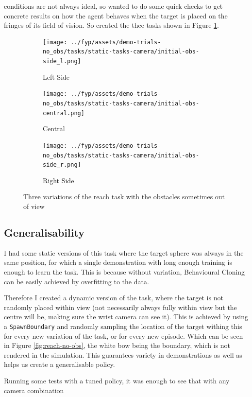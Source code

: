 conditions are not always ideal, so wanted to do some quick checks to get concrete results on how the agent behaves when the target is placed on the fringes of its field of vision. So created the thee tasks shown in Figure \ref{fig:no-obs-3-views}.

\begin{figure}[htbp]
  \begin{subfigure}{0.3\linewidth}
    \centering
    \texttt{[image: ../fyp/assets/demo-trials-no\_obs/tasks/static-tasks-camera/initial-obs-side\_l.png]}      
    \caption{Left Side}
  \end{subfigure}
  \hfill
  \begin{subfigure}{0.3\textwidth}
    \centering
    \texttt{[image: ../fyp/assets/demo-trials-no\_obs/tasks/static-tasks-camera/initial-obs-central.png]}
    \caption{Central}
  \end{subfigure}
  \hfill
  \begin{subfigure}{0.3\linewidth}
    \centering
    \texttt{[image: ../fyp/assets/demo-trials-no\_obs/tasks/static-tasks-camera/initial-obs-side\_r.png]}
    \caption{Right Side}
  \end{subfigure}%
  \caption{Three variations of the reach task with the obstacles sometimes out of view}\label{fig:no-obs-3-views}
\end{figure}


\subsection{Generalisability}
I had some static versions of this task where the target sphere was always in the same position, for which a single demonstration with long enough training is enough to learn the task. This is because without variation, Behavioural Cloning can be easily achieved by overfitting to the data. 

Therefore I created a dynamic version of the task, where the target is not randomly placed within view (not necessarily always fully within view but the centre will be, making sure the wrist camera can see it). This is achieved by using a \verb|SpawnBoundary| and randomly sampling the location of the target withing this for every new variation of the task, or for every new episode. Which can be seen in Figure \ref{fig:reach-no-obs}, the white bow being the boundary, which is not rendered in the simulation. This guarantees variety in demonstrations as well as helps us create a generalisable policy.

Running some tests with a tuned policy, it was enough to see that with any camera combination


